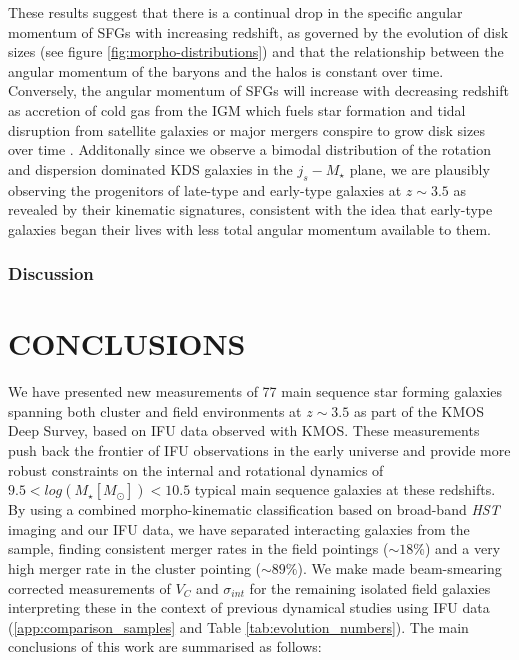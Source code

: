 \documentclass[a4paper,fleqn,usenatbib]{mn2e}
\begin{document}
These results suggest that there is a continual drop in the specific angular momentum of SFGs with increasing redshift, as governed by the evolution of disk sizes \citep[e.g.][]{Trujillo2007} (see figure \ref{fig:morpho-distributions}) and that the relationship between the angular momentum of the baryons and the halos is constant over time.
Conversely, the angular momentum of SFGs will increase with decreasing redshift as accretion of cold gas from the IGM which fuels star formation and tidal disruption from satellite galaxies or major mergers conspire to grow disk sizes over time \citep{Trujillo2007,Buitrago2008,VanderWel2014a}.
Additonally since we observe a bimodal distribution of the rotation and dispersion dominated KDS galaxies in the $j_{s}-M_{\star}$ plane, we are plausibly observing the progenitors of late-type and early-type galaxies at $z\sim3.5$ as revealed by their kinematic signatures, consistent with the idea that early-type galaxies began their lives with less total angular momentum available to them.

\subsubsection{Discussion}\label{subsubsec:ang_mom_discussion}

\section{CONCLUSIONS}\label{sec:conclusion}
We have presented new measurements of 77 main sequence star forming galaxies spanning both cluster and field environments at $z\sim3.5$ as part of the KMOS Deep Survey, based on IFU data observed with KMOS.
These measurements push back the frontier of IFU observations in the early universe and provide more robust constraints on the internal and rotational dynamics of $9.5 < log(M_{\star}[M_{\odot}])< 10.5$ typical main sequence galaxies at these redshifts.
By using a combined morpho-kinematic classification based on broad-band {\em HST} imaging and our IFU data, we have separated interacting galaxies from the sample, finding consistent merger rates in the field pointings ($\sim18\%$) and a very high merger rate in the cluster pointing ($\sim89\%$).
We make made beam-smearing corrected measurements of $V_{C}$ and $\sigma_{int}$ for the remaining isolated field galaxies interpreting these in the context of previous dynamical studies using IFU data (\cref{app:comparison_samples} and Table \ref{tab:evolution_numbers}).
The main conclusions of this work are summarised as follows:
\end{document}
